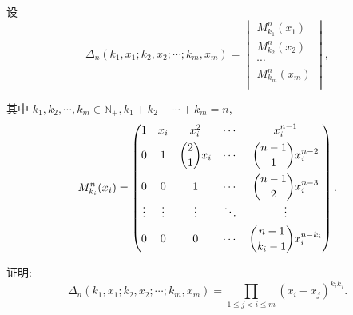 \documentclass{ctexart}
\begin{document}
\begin{exercise}[2.4]
    设
    \[\Delta_n(k_1,x_1;k_2,x_2;\cdots;k_m,x_m)=\begin{vmatrix}
        M_{k_1}^n(x_1) \\
        M_{k_2}^n(x_2) \\
        \cdots \\
        M_{k_m}^n(x_m) \\
    \end{vmatrix},\]

    其中 $k_1,k_2,\cdots,k_m\in\mathbb{N}_+,k_1+k_2+\cdots+k_m=n$,
    \[M_{k_i}^n(x_i)=\begin{pmatrix}
        1 & x_i & x_i^2 & \cdots & x_i^{n-1} \\[4pt]
        0 & 1 & \dbinom{2}{1}x_i & \cdots & \dbinom{n-1}{1}x_i^{n-2} \\[10pt]
        0 & 0 & 1 & \cdots & \dbinom{n-1}{2}x_i^{n-3} \\
        \vdots & \vdots & \vdots & \ddots & \vdots \\[4pt]
        0 & 0 & 0 & \cdots & \dbinom{n-1}{k_i-1}x_i^{n-k_i} \\
    \end{pmatrix}.\]

    证明:
    \[\Delta_n(k_1,x_1;k_2,x_2;\cdots;k_m,x_m)=\prod\limits_{1\leq j<i\leq m}(x_i-x_j)^{k_ik_j}.\]
\end{exercise}
\end{document}
